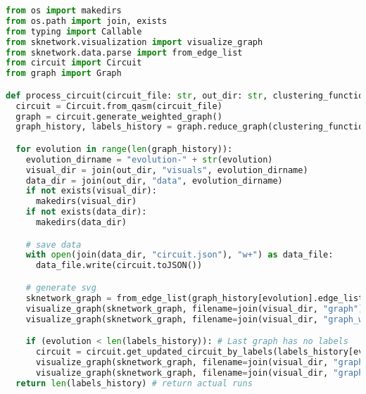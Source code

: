   \begin{lstlisting}[language=Python,caption=\texttt{processing.py},label=lst:processing.py]
from os import makedirs
from os.path import join, exists
from typing import Callable
from sknetwork.visualization import visualize_graph
from sknetwork.data.parse import from_edge_list
from circuit import Circuit
from graph import Graph

def process_circuit(circuit_file: str, out_dir: str, clustering_function: Callable[[Graph], list[int]], max_runs=1) -> int:
  circuit = Circuit.from_qasm(circuit_file)
  graph = circuit.generate_weighted_graph()
  graph_history, labels_history = graph.reduce_graph(clustering_function, max_runs=max_runs)

  for evolution in range(len(graph_history)):
    evolution_dirname = "evolution-" + str(evolution)
    visual_dir = join(out_dir, "visuals", evolution_dirname)
    data_dir = join(out_dir, "data", evolution_dirname)
    if not exists(visual_dir):
      makedirs(visual_dir)
    if not exists(data_dir):
      makedirs(data_dir)

    # save data
    with open(join(data_dir, "circuit.json"), "w+") as data_file:
      data_file.write(circuit.toJSON())

    # generate svg
    sknetwork_graph = from_edge_list(graph_history[evolution].edge_list, weighted=True)
    visualize_graph(sknetwork_graph, filename=join(visual_dir, "graph"), node_size=20) # type: ignore
    visualize_graph(sknetwork_graph, filename=join(visual_dir, "graph_w"), node_size=20, display_edge_weight=True) # type: ignore

    if (evolution < len(labels_history)): # Last graph has no labels
      circuit = circuit.get_updated_circuit_by_labels(labels_history[evolution])
      visualize_graph(sknetwork_graph, filename=join(visual_dir, "graph_l"), node_size=20, labels=labels_history[evolution]) # type: ignore
      visualize_graph(sknetwork_graph, filename=join(visual_dir, "graph_wl"), node_size=20, labels=labels_history[evolution], display_edge_weight=True) # type: ignore
  return len(labels_history) # return actual runs
  \end{lstlisting}
